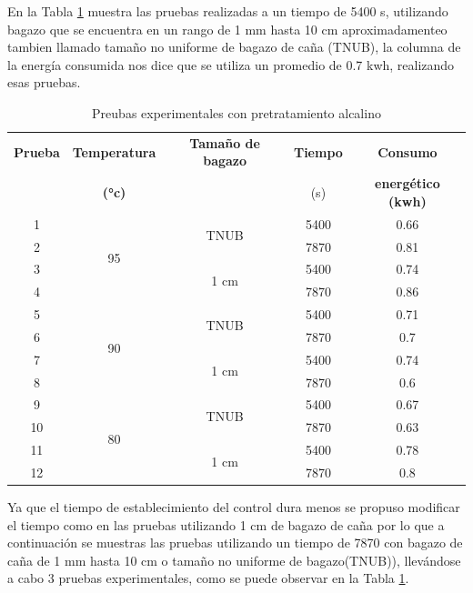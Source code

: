 \documentclass[12pt]{article}
\begin{document}
	En la Tabla \ref{Pretratamiento Alcalino} muestra las pruebas realizadas a un tiempo de 5400 s, utilizando bagazo que se encuentra en un rango de 1 mm hasta 10 cm aproximadamenteo tambien llamado tamaño no uniforme de bagazo de caña (TNUB), la columna de la energía consumida nos dice que se utiliza un promedio de 0.7 kwh, realizando esas pruebas.
	
	\begin{table}[!ht]
		\centering
		\caption{Preubas experimentales con pretratamiento alcalino}
		\begin{tabular}{|c|c|c|c|c|}
			\hline
			\textbf{Prueba} & \textbf{Temperatura} & \textbf{Tamaño de bagazo} & \textbf{Tiempo} & \textbf{Consumo } \\ 
			&\textbf{ (°c)}& &(s)	&\textbf{ energético (kwh)}\\ \hline
			1 & \multirow{4}{*}{95} & \multirow{2}{*}{TNUB} & 5400 & 0.66  \\ \cline{1-1} \cline{4-5}
			2 &  &  & 7870 & 0.81  \\ \cline{3-5}  \cline{1-1} 
			3 &  & \multirow{2}{*}{1 cm} & 5400 & 0.74 \\  \cline{1-1} \cline{4-5}
			4 &  &  & 7870 & 0.86 \\ \cline{1-1}  \hline
			5 & \multirow{4}{*}{90}& \multirow{2}{*}{TNUB} & 5400 & 0.71  \\ \cline{1-1}  \cline{4-5}
			6 &  &  & 7870 & 0.7  \\ \cline{1-1} \cline{3-5}
			7 &  & \multirow{2}{*}{1 cm} & 5400 & 0.74 \\ \cline{1-1}\cline{4-5}
			8 &  &  & 7870 & 0.6 \\ \hline
			9 & \multirow{4}{*}{80} & \multirow{2}{*}{TNUB} & 5400 & 0.67  \\ \cline{1-1}\cline{4-5}
			10 &  &  & 7870 & 0.63  \\ \cline{1-1} \cline{3-5}
			11 &  &\multirow{2}{*}{1 cm} & 5400 & 0.78 \\ \cline{1-1}\cline{4-5}
			12 &  &  & 7870 & 0.8 \\ \hline
		\end{tabular}
		\label{Pretratamiento Alcalino}
	\end{table}

	Ya que el tiempo de establecimiento del control dura menos se propuso modificar el tiempo como en las pruebas utilizando 1 cm de bagazo de caña por lo que a continuación se muestras las pruebas utilizando un tiempo de 7870 con bagazo de caña de 1 mm hasta 10 cm o tamaño no uniforme de bagazo(TNUB)), llevándose a cabo 3 pruebas experimentales, como se puede observar en la Tabla \ref{Pretratamiento Alcalino}.
		
\end{document}
